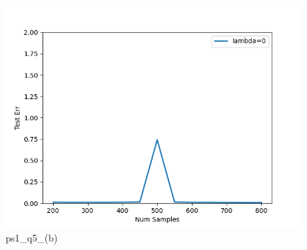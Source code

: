 
\begin{answer}

\begin{figure}
    \centering
    \includegraphics[width=0.5\linewidth]{unreg.png}
    \caption{ps1\_q5\_(b)}
    \label{fig:enter-label}
\end{figure}
\end{answer}
